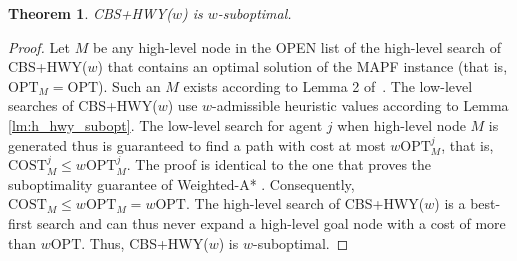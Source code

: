 \documentclass[letterpaper]{article}
\newtheorem{theorem}{Theorem}
\theoremstyle{definition}
\newcommand{\open}{\mbox{OPEN}\xspace}
\newcommand{\opt}{\mbox{OPT}\xspace}
\newcommand{\optn}[1]{\ensuremath{\mbox{OPT}_{#1}}}
\newcommand{\optna}[2]{\ensuremath{\mbox{OPT}_{#1}^{#2}}}
\newcommand{\costn}[1]{\ensuremath{\mbox{COST}_{#1}}}
\newcommand{\costna}[2]{\ensuremath{\mbox{COST}_{#1}^{#2}}}
\begin{document}
\begin{theorem}
  CBS+HWY($w$) is $w$-suboptimal.
\end{theorem}

\begin{proof}
  Let $M$ be any high-level node in the \open list of the high-level search of
  CBS+HWY($w$) that contains an optimal solution of the MAPF instance (that
  is, $\optn M = \opt$). Such an $M$ exists according to Lemma 2
  of~\cite{SSFS:AIJ:15}. The low-level searches of CBS+HWY($w$) use
  $w$-admissible heuristic values according to Lemma
  \ref{lm:h_hwy_subopt}. The low-level search for agent $j$ when high-level
  node $M$ is generated thus is guaranteed to find a path with cost at most $w
  \optna M j$, that is, $\costna M j \leq w \optna M j$. The proof is
  identical to the one that proves the suboptimality guarantee of Weighted-A*
  \cite{P:AI:70}. Consequently, $\costn M \leq w \optn M = w \opt$. The
  high-level search of CBS+HWY($w$) is a best-first search and can thus never
  expand a high-level goal node with a cost of more than $w \opt$. Thus,
  CBS+HWY($w$) is $w$-suboptimal.
\end{proof}

\begin{table}[h]
\caption{Expanded and generated nodes and solution costs for CBS, CBS+HWY($w$), and
  ECBS($w$) for the example in Figure \ref{example1_fig}.}
\label{tbl:example1}
\end{table}
\end{document}
